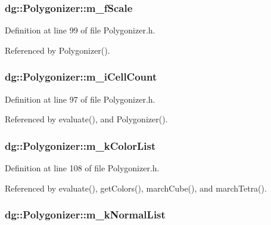 \subsubsection{ dg::Polygonizer::m\_\-f\-Scale\hspace{0.3cm}{\tt  [protected]}}\label{classdg_1_1Polygonizer_n3}




Definition at line 99 of file Polygonizer.h.

Referenced by Polygonizer().
\subsubsection{ dg::Polygonizer::m\_\-i\-Cell\-Count\hspace{0.3cm}{\tt  [protected]}}\label{classdg_1_1Polygonizer_n2}




Definition at line 97 of file Polygonizer.h.

Referenced by evaluate(), and Polygonizer().
\subsubsection{ dg::Polygonizer::m\_\-k\-Color\-List\hspace{0.3cm}{\tt  [protected]}}\label{classdg_1_1Polygonizer_n10}




Definition at line 108 of file Polygonizer.h.

Referenced by evaluate(), get\-Colors(), march\-Cube(), and march\-Tetra().
\subsubsection{ dg::Polygonizer::m\_\-k\-Normal\-List\hspace{0.3cm}{\tt  [protected]}}\label{classdg_1_1Polygonizer_n9}




